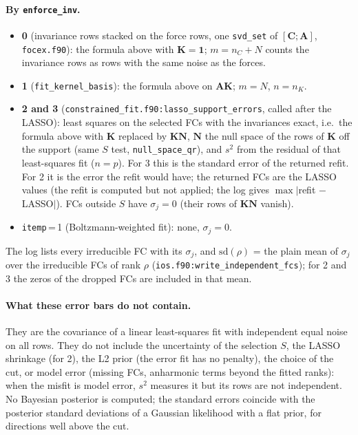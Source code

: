 \documentclass[11pt,a4paper]{article}
\newcommand{\bA}{\mathbf A}
\newcommand{\bC}{\mathbf C}
\newcommand{\bK}{\mathbf K}
\newcommand{\bN}{\mathbf N}
\newcommand{\code}[1]{\texttt{#1}}
\begin{document}
\paragraph{By \code{enforce\_inv}.}
\begin{itemize}
\item \textbf{0} (invariance rows stacked on the force rows, one \code{svd\_set} of $[\bC;\bA]$, \code{focex.f90}): the formula
above with $\bK=\mathbf 1$; $m=n_C+N$ counts the invariance rows as rows with the same noise as the forces.
\item \textbf{1} (\code{fit\_kernel\_basis}): the formula above on $\bA\bK$; $m=N$, $n=n_K$.
\item \textbf{2 and 3} (\code{constrained\_fit.f90:lasso\_support\_errors}, called after the LASSO): least squares on the selected FCs
with the invariances exact, i.e.\ the formula above with $\bK$ replaced by $\bK\bN$, $\bN$ the null space of the rows of $\bK$
off the support (same $S$ test, \code{null\_space\_qr}), and $s^2$ from the residual of that least-squares fit ($n=p$).
For 3 this is the standard error of the returned refit. For 2 it is the error the refit would have; the returned FCs are the
LASSO values (the refit is computed but not applied; the log gives $\max|$refit $-$ LASSO$|$). FCs outside $S$ have
$\sigma_j=0$ (their rows of $\bK\bN$ vanish).
\item \code{itemp}\,=\,1 (Boltzmann-weighted fit): none, $\sigma_j=0$.
\end{itemize}
The log lists every irreducible FC with its $\sigma_j$, and $\mathrm{sd}(\rho)$ = the plain mean of $\sigma_j$ over the irreducible FCs
of rank $\rho$ (\code{ios.f90:write\_independent\_fcs}); for 2 and 3 the zeros of the dropped FCs are included in that mean.

\paragraph{What these error bars do not contain.} They are the covariance of a linear least-squares fit with independent equal
noise on all rows. They do not include the uncertainty of the selection $S$, the LASSO shrinkage (for 2), the L2 prior (the
error fit has no penalty), the choice of the cut, or model error (missing FCs, anharmonic terms beyond the fitted ranks):
when the misfit is model error, $s^2$ measures it but its rows are not independent. No Bayesian posterior is computed; the
standard errors coincide with the posterior standard deviations of a Gaussian likelihood with a flat prior, for directions
well above the cut.
\end{document}
